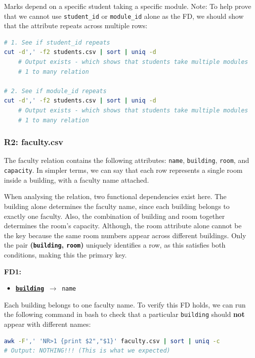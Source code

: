 \documentclass[12pt, a4paper]{report}
\begin{document}
Marks depend on a specific student taking a specific module. Note: To help prove that we cannot use \texttt{student\_id} or \texttt{module\_id} alone as the FD, we should show that the attribute repeats across multiple rows:

\begin{lstlisting}[language=bash]
# 1. See if student_id repeats
cut -d',' -f2 students.csv | sort | uniq -d
    # Output exists - which shows that students take multiple modules
    # 1 to many relation

# 2. See if module_id repeats
cut -d',' -f2 students.csv | sort | uniq -d
    # Output exists - which shows that students take multiple modules
    # 1 to many relation
\end{lstlisting}

\subsubsection*{R2: faculty.csv}

The faculty relation contains the following attributes: \texttt{name}, \texttt{building}, \texttt{room}, and \texttt{capacity}. In simpler terms, we can say that each row represents a single room inside a building, with a faculty name attached.

When analysing the relation, two functional dependencies exist here. The building alone determines the faculty name, since each building belongs to exactly one faculty. Also, the combination of building and room together determines the room's capacity. Although, the room attribute alone cannot be the key because the same room numbers appear across different buildings. Only the pair \textbf{(\texttt{building}, \texttt{room})} uniquely identifies a row, as this satisfies both conditions, making this the primary key.

\medskip
\noindent \textbf{FD1:}

\begin{itemize}
    \item{\texttt{\textbf{\underline{building}} $\rightarrow$ name}}
\end{itemize}

Each building belongs to one faculty name. To verify this FD holds, we can run the following command in bash to check that a particular \texttt{building} should \textbf{not} appear with different names:

\begin{lstlisting}[language=bash]
awk -F',' 'NR>1 {print $2","$1}' faculty.csv | sort | uniq -c
# Output: NOTHING!!! (This is what we expected)
\end{lstlisting}
\end{document}
